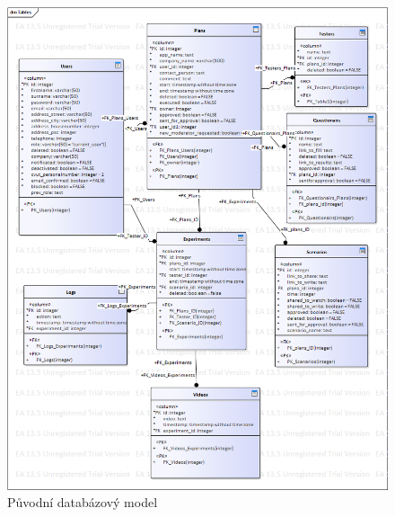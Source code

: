 \documentclass[thesis=M,czech]{FITthesis}[2012/06/26]
\begin{document}
\begin{figure}[h]\centering
	\includegraphics[width=1\textwidth]{images/db_orig.png}
	\caption{Původní databázový model}\label{img:navrh_backend_db_orig}
\end{figure}
\end{document}
